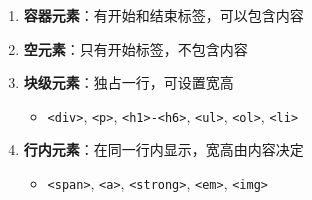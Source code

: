 \begin{enumerate}
\def\labelenumi{\arabic{enumi}.}
\item
  \textbf{容器元素}：有开始和结束标签，可以包含内容

\begin{Shaded}
\begin{Highlighting}[]
\DataTypeTok{\textless{}}\DataTypeTok{\textgreater{}}\DataTypeTok{\textless{}/}\DataTypeTok{\textgreater{}}
\DataTypeTok{\textless{}}\DataTypeTok{\textgreater{}}\DataTypeTok{\textless{}/}\DataTypeTok{\textgreater{}}
\end{Highlighting}
\end{Shaded}
\item
  \textbf{空元素}：只有开始标签，不包含内容

\begin{Shaded}
\begin{Highlighting}[]
\DataTypeTok{\textless{}}\OperatorTok{=}\OperatorTok{=}\DataTypeTok{\textgreater{}}
\DataTypeTok{\textless{}}\DataTypeTok{\textgreater{}}
\DataTypeTok{\textless{}}\DataTypeTok{\textgreater{}}
\end{Highlighting}
\end{Shaded}
\item
  \textbf{块级元素}：独占一行，可设置宽高

  \begin{itemize}
  \tightlist
  \item
    \texttt{\textless{}div\textgreater{}}, \texttt{\textless{}p\textgreater{}}, \texttt{\textless{}h1\textgreater{}-\textless{}h6\textgreater{}}, \texttt{\textless{}ul\textgreater{}}, \texttt{\textless{}ol\textgreater{}}, \texttt{\textless{}li\textgreater{}}
  \end{itemize}
\item
  \textbf{行内元素}：在同一行内显示，宽高由内容决定

  \begin{itemize}
  \tightlist
  \item
    \texttt{\textless{}span\textgreater{}}, \texttt{\textless{}a\textgreater{}}, \texttt{\textless{}strong\textgreater{}}, \texttt{\textless{}em\textgreater{}}, \texttt{\textless{}img\textgreater{}}
  \end{itemize}
\end{enumerate}

